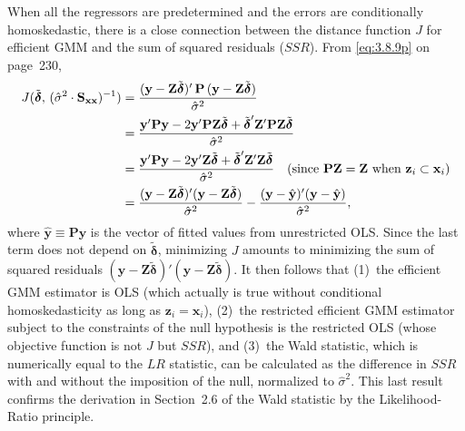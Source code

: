 When all the regressors are predetermined and the errors are conditionally homoskedastic,
there is a close connection between the distance function $J$ for efficient
GMM and the sum of squared residuals ($SSR$).  From \eqref{eq:3.8.9p} on page~230,
\begin{align}
  J(\tilde{\boldsymbol{\delta}},\, (\hat{\sigma}^2 \cdot \mathbf{S}_{\mathbf{xx}})^{-1})
  &= \frac{(\mathbf{y} - \mathbf{Z}\tilde{\boldsymbol{\delta}})'\,
     \mathbf{P}\,(\mathbf{y} - \mathbf{Z}\tilde{\boldsymbol{\delta}})}{\hat{\sigma}^2}
  \notag \\
  &= \frac{\mathbf{y}'\mathbf{P}\mathbf{y}
     - 2\mathbf{y}'\mathbf{P}\mathbf{Z}\tilde{\boldsymbol{\delta}}
     + \tilde{\boldsymbol{\delta}}'\mathbf{Z}'\mathbf{P}\mathbf{Z}\tilde{\boldsymbol{\delta}}}
     {\hat{\sigma}^2}
  \notag \\
  &= \frac{\mathbf{y}'\mathbf{P}\mathbf{y}
     - 2\mathbf{y}'\mathbf{Z}\tilde{\boldsymbol{\delta}}
     + \tilde{\boldsymbol{\delta}}'\mathbf{Z}'\mathbf{Z}\tilde{\boldsymbol{\delta}}}
     {\hat{\sigma}^2}
  \quad \text{(since $\mathbf{P}\mathbf{Z} = \mathbf{Z}$ when
    $\mathbf{z}_i \subset \mathbf{x}_i$)}
  \notag \\
  &= \frac{(\mathbf{y} - \mathbf{Z}\tilde{\boldsymbol{\delta}})'
     (\mathbf{y} - \mathbf{Z}\tilde{\boldsymbol{\delta}})}{\hat{\sigma}^2}
  - \frac{(\mathbf{y} - \hat{\mathbf{y}})'(\mathbf{y} - \hat{\mathbf{y}})}
     {\hat{\sigma}^2},
  \label{eq:3.8.14}
\end{align}
where $\hat{\mathbf{y}} \equiv \mathbf{P}\mathbf{y}$ is the vector of fitted values from unrestricted OLS.
Since the last term does not depend on $\tilde{\boldsymbol{\delta}}$, minimizing $J$ amounts to minimizing the
sum of squared residuals $(\mathbf{y} - \mathbf{Z}\tilde{\boldsymbol{\delta}})'(\mathbf{y} -
\mathbf{Z}\tilde{\boldsymbol{\delta}})$.  It then follows that (1)~the efficient GMM
estimator is OLS (which actually is true without conditional homoskedasticity as long as
$\mathbf{z}_i = \mathbf{x}_i$), (2)~the restricted efficient GMM estimator subject to the constraints
of the null hypothesis is the restricted OLS (whose objective function is not $J$ but
$SSR$), and (3)~the Wald statistic, which is numerically equal to the $LR$ statistic, can
be calculated as the difference in $SSR$ with and without the imposition of the null,
normalized to $\hat{\sigma}^2$.  This last result confirms the derivation in Section~2.6
of the Wald statistic by the Likelihood-Ratio principle.

